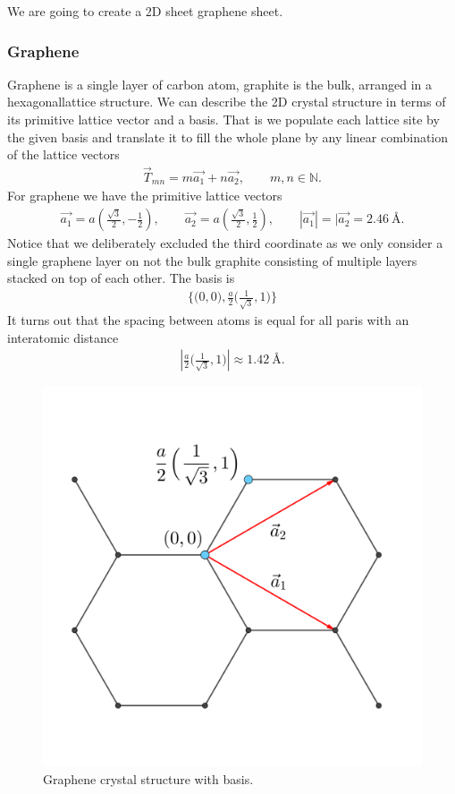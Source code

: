 We are going to create a 2D sheet graphene sheet. 

\subsubsection{Graphene}

Graphene is a single layer of carbon atom, graphite is the bulk, arranged in a
hexagonallattice structure. We can describe the 2D crystal structure in terms of
its primitive lattice vector and a basis. That is we populate each lattice site
by the given basis and translate it to fill the whole plane by any linear
combination of the lattice vectors
\begin{align*}
  \vec{T}_{mn} = m\vec{a_1} + n\vec{a_2}, \qquad m,n \in \mathbb{N}.
\end{align*}
For graphene we have the primitive lattice vectors 
\begin{align*}
  \vec{a_1} = a \left(\frac{\sqrt{3}}{2}, -\frac{1}{2}\right), \qquad \vec{a_2} = a \left(\frac{\sqrt{3}}{2}, \frac{1}{2}\right), \qquad |\vec{a_1}| = |\vec{a_2} = 2.46 \ \text{Å}.
\end{align*}
Notice that we deliberately excluded the third coordinate as we only consider a
single graphene layer on not the bulk graphite consisting of multiple layers
stacked on top of each other. The basis is 
\begin{align*}
  \Big\{\Big(0,0\Big), \frac{a}{2}\Big(\frac{1}{\sqrt{3}}, 1 \Big) \Big\}
\end{align*}
It turns out that the spacing between atoms is equal for all paris with an
interatomic distance 
\begin{align*}
  \left|\frac{a}{2}\Big(\frac{1}{\sqrt{3}}, 1 \Big)\right| \approx 1.42 \ \text{Å}.
\end{align*}


\begin{figure}[H]
  \centering
  \includegraphics[width=0.3\linewidth]{figures/crystal.png}
  \caption{Graphene crystal structure with basis.}
  \label{fig:graphene_crystal}
\end{figure}



